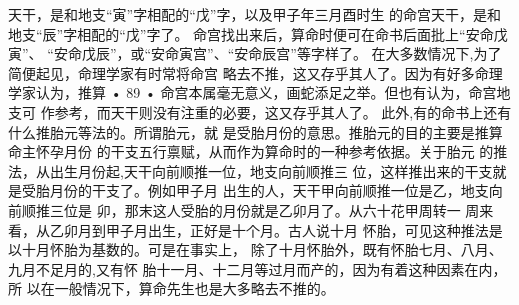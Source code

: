 天干，是和地支“寅”字相配的“戊”字，以及甲子年三月酉时生
的命宫天干，是和地支“辰”字相配的“戊”字了。
命宫找出来后，算命时便可在命书后面批上“安命戊寅”、
“安命戊辰”，或“安命寅宫”、“安命辰宫”等字样了。
在大多数情况下,为了简便起见，命理学家有时常将命宫
略去不推，这又存乎其人了。因为有好多命理学家认为，推算
• 89 •
命宫本属毫无意义，画蛇添足之举。但也有认为，命宫地支可
作参考，而天干则没有注重的必要，这又存乎其人了。
此外,有的命书上还有什么推胎元等法的。所谓胎元，就
是受胎月份的意思。推胎元的目的主要是推算命主怀孕月份
的干支五行禀赋，从而作为算命时的一种参考依据。关于胎元
的推法，从出生月份起,天干向前顺推一位，地支向前顺推三
位，这样推出来的干支就是受胎月份的干支了。例如甲子月
出生的人，天干甲向前顺推一位是乙，地支向前顺推三位是
卯，那末这人受胎的月份就是乙卯月了。从六十花甲周转一
周来看，从乙卯月到甲子月出生，正好是十个月。古人说十月
怀胎，可见这种推法是以十月怀胎为基数的。可是在事实上，
除了十月怀胎外，既有怀胎七月、八月、九月不足月的,又有怀
胎十一月、十二月等过月而产的，因为有着这种因素在内，所
以在一般情况下，算命先生也是大多略去不推的。

